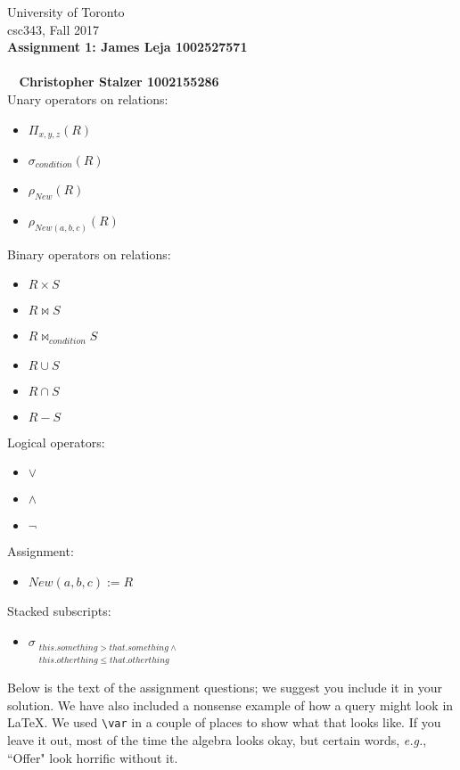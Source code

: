 \documentclass{article}
\newcommand{\var}[1]{\mathit{#1}}
\begin{document}
\noindent
University of Toronto\\
{\sc csc}343, Fall 2017\\[10pt]
{\LARGE\bf Assignment 1: James Leja 1002527571 \\\\\
\hspace*{4.3cm} Christopher Stalzer 1002155286} \\[10pt]

\noindent
Unary operators on relations:
\begin{itemize}
\item $\Pi_{x, y, z} (R)$
\item $\sigma_{condition} (R) $
\item $\rho_{New} (R) $
\item $\rho_{New(a, b, c)} (R) $
\end{itemize}
Binary operators on relations:
\begin{itemize}
\item $R \times S$
\item $R \bowtie S$
\item $R \bowtie_{condition} S$
\item $R \cup S$
\item $R \cap S$
\item $R - S$
\end{itemize}
Logical operators:
\begin{itemize}
\item $\vee$
\item $\wedge$
\item $\neg$
\end{itemize}
Assignment:
\begin{itemize}
\item $New(a, b, c) := R$
\end{itemize}
Stacked subscripts:
\begin{itemize}
\item
$\sigma_{\substack{this.something > that.something \wedge \\ this.otherthing \leq that.otherthing}}$
\end{itemize}

\noindent
Below is the text of the assignment questions; we suggest you include it in your solution.
We have also included a nonsense example of how a query might look in LaTeX.  
We used \verb|\var| in a couple of places to show what that looks like.  
If you leave it out, most of the time the algebra looks okay, but certain words,
{\it e.g.}, ``Offer" look horrific without it.
\end{document}
